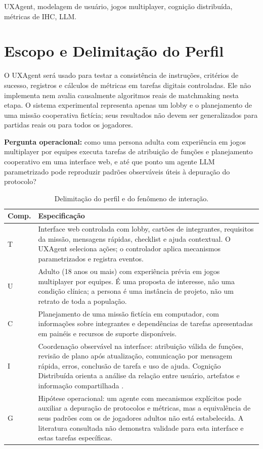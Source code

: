 \documentclass[conference]{IEEEtran}
\begin{document}
\begin{IEEEkeywords}
UXAgent, modelagem de usuário, jogos multiplayer, cognição distribuída, métricas de IHC, LLM.
\end{IEEEkeywords}

\section{Escopo e Delimitação do Perfil}

O UXAgent será usado para testar a consistência de instruções, critérios de sucesso, registros e cálculos de métricas em tarefas digitais controladas. Ele não implementa nem avalia causalmente algoritmos reais de matchmaking nesta etapa. O sistema experimental representa apenas um lobby e o planejamento de uma missão cooperativa fictícia; seus resultados não devem ser generalizados para partidas reais ou para todos os jogadores.

\textbf{Pergunta operacional:} como uma persona adulta com experiência em jogos multiplayer por equipes executa tarefas de atribuição de funções e planejamento cooperativo em uma interface web, e até que ponto um agente LLM parametrizado pode reproduzir padrões observáveis úteis à depuração do protocolo?

\begin{table}[!t]
\centering
\caption{Delimitação do perfil e do fenômeno de interação.}
\label{tab:tucig}
\scriptsize
\renewcommand{\arraystretch}{1.1}
\begin{tabularx}{\columnwidth}{@{}p{0.6cm}Y@{}}
\toprule
\textbf{Comp.} & \textbf{Especificação} \\
\midrule
T & Interface web controlada com lobby, cartões de integrantes, requisitos da missão, mensagens rápidas, checklist e ajuda contextual. O UXAgent seleciona ações; o controlador aplica mecanismos parametrizados e registra eventos. \\
U & Adulto (18 anos ou mais) com experiência prévia em jogos multiplayer por equipes. É uma proposta de interesse, não uma condição clínica; a persona é uma instância de projeto, não um retrato de toda a população. \\
C & Planejamento de uma missão fictícia em computador, com informações sobre integrantes e dependências de tarefas apresentadas em painéis e recursos de suporte disponíveis. \\
I & Coordenação observável na interface: atribuição válida de funções, revisão de plano após atualização, comunicação por mensagem rápida, erros, conclusão de tarefa e uso de ajuda. Cognição Distribuída orienta a análise da relação entre usuário, artefatos e informação compartilhada \cite{hollan2000}. \\
G & Hipótese operacional: um agente com mecanismos explícitos pode auxiliar a depuração de protocolos e métricas, mas a equivalência de seus padrões com os de jogadores adultos não está estabelecida. A literatura consultada não demonstra validade para esta interface e estas tarefas específicas. \\
\bottomrule
\end{tabularx}
\end{table}
\end{document}
